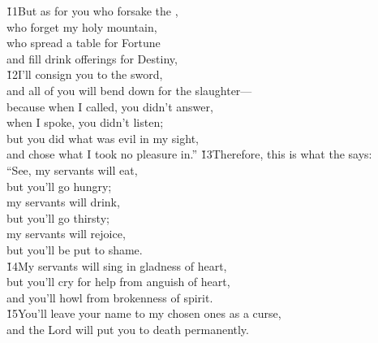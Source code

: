 \begin{poetry}
\poeml \v{11}But as for you who forsake the , \\
\poemll    who forget my holy mountain, \\
\poeml who spread a table for Fortune \\
\poemll    and fill drink offerings for Destiny, \\
\poeml \v{12}I'll consign you to the sword, \\
\poemll    and all of you will bend down for the slaughter--- \\
\poeml because when I called, you didn't answer, \\
\poemll    when I spoke, you didn't listen; \\
\poeml but you did what was evil in my sight, \\
\poemll    and chose what I took no pleasure in.''
\poeml \v{13}Therefore, this is what the  says: \\
\poeml ``See, my servants will eat, \\
\poemll    but you'll go hungry; \\
\poeml my servants will drink, \\
\poemll    but you'll go thirsty; \\
\poeml my servants will rejoice, \\
\poemll    but you'll be put to shame. \\
\poeml \v{14}My servants will sing in gladness of heart, \\
\poemll    but you'll cry for help from anguish of heart, \\
\poemlll       and you'll howl from brokenness of spirit. \\
\poeml \v{15}You'll leave your name to my chosen ones as a curse, \\
\poemll    and the Lord  will put you to death permanently. \\

\end{poetry}
